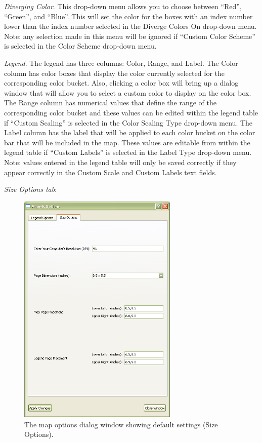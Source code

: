 \emph{Diverging Color}. 
This drop-down menu allows 
you to choose between ``Red'', ``Green'', and ``Blue''.  
This will set the color for the boxes with an index number lower than 
the index number selected in the Diverge Colors On drop-down menu.
Note: any selection made in this menu will be ignored if 
``Custom Color Scheme'' is selected in the Color Scheme drop-down menu.

\emph{Legend}. 
The legend has three columns: Color, Range, and Label. The 
Color column has color boxes that display the color currently selected for the 
corresponding color bucket. Also, clicking a color box will bring up a dialog 
window that will allow you to select a custom color to display on the color box. 
The Range column has numerical values that define the range of the corresponding 
color bucket and these values can be edited within the legend table if ``Custom Scaling'' is 
selected in the Color Scaling Type drop-down menu. The Label column has the label that 
will be applied to each color bucket on the color bar that will be included in the map. 
These values are editable from within the legend table if ``Custom Labels'' is selected 
in the Label Type drop-down menu. Note: values entered in the legend table will 
only be saved correctly if they appear correctly in the Custom Scale and Custom 
Labels text fields.

\clearpage

\emph{Size Options tab}:

\begin{figure}[h]
\begin{center}
\includegraphics[width=3in]{part-gui/images/result-manager-mapnik-options-dialog-size.png}
\end{center}
\caption{The map options dialog window showing default settings (Size Options).}
\label{fig:result-manager-mapnik-options-dialog-size}
\end{figure}


